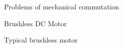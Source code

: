 \documentclass[compress]{beamer}
\begin{document}
{
\begin{frame}{Problems of mechanical commutation}

%
%

\end{frame}
}

{
\begin{frame}{Brushless DC Motor}

%
%

\end{frame}
}

{
\begin{frame}{Typical brushless motor}

\end{frame}
}
\end{document}
